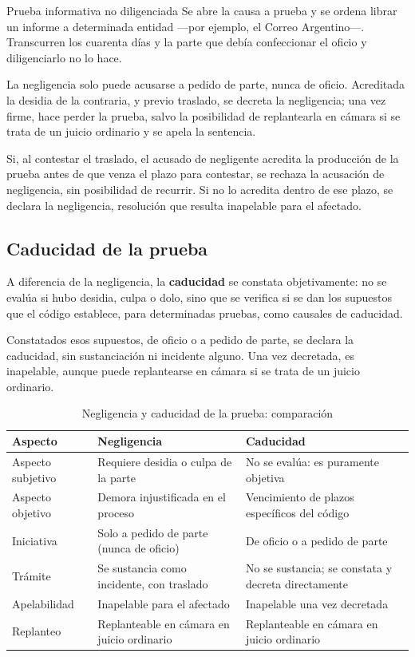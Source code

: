 \documentclass[12pt,oneside]{book}
\begin{document}
\begin{example}{Prueba informativa no diligenciada}
Se abre la causa a prueba y se ordena librar un informe a determinada entidad —por ejemplo, el Correo Argentino—. Transcurren los cuarenta días y la parte que debía confeccionar el oficio y diligenciarlo no lo hace.
\end{example}

La negligencia solo puede acusarse a pedido de parte, nunca de oficio. Acreditada la desidia de la contraria, y previo traslado, se decreta la negligencia; una vez firme, hace perder la prueba, salvo la posibilidad de replantearla en cámara si se trata de un juicio ordinario y se apela la sentencia.

Si, al contestar el traslado, el acusado de negligente acredita la producción de la prueba antes de que venza el plazo para contestar, se rechaza la acusación de negligencia, sin posibilidad de recurrir. Si no lo acredita dentro de ese plazo, se declara la negligencia, resolución que resulta inapelable para el afectado.

\subsection{Caducidad de la prueba}

A diferencia de la negligencia, la \textbf{caducidad} se constata objetivamente: no se evalúa si hubo desidia, culpa o dolo, sino que se verifica si se dan los supuestos que el código establece, para determinadas pruebas, como causales de caducidad.

Constatados esos supuestos, de oficio o a pedido de parte, se declara la caducidad, sin sustanciación ni incidente alguno. Una vez decretada, es inapelable, aunque puede replantearse en cámara si se trata de un juicio ordinario.

\begin{table}[H]
\centering
\begin{tabularx}{\textwidth}{>{\raggedright\arraybackslash}p{} X X}
\toprule
\textbf{Aspecto} & \textbf{Negligencia} & \textbf{Caducidad} \\
\midrule
Aspecto subjetivo & Requiere desidia o culpa de la parte & No se evalúa: es puramente objetiva \\
Aspecto objetivo & Demora injustificada en el proceso & Vencimiento de plazos específicos del código \\
Iniciativa & Solo a pedido de parte (nunca de oficio) & De oficio o a pedido de parte \\
Trámite & Se sustancia como incidente, con traslado & No se sustancia; se constata y decreta directamente \\
Apelabilidad & Inapelable para el afectado & Inapelable una vez decretada \\
Replanteo & Replanteable en cámara en juicio ordinario & Replanteable en cámara en juicio ordinario \\
\bottomrule
\end{tabularx}
\caption{Negligencia y caducidad de la prueba: comparación}
\end{table}
\end{document}
